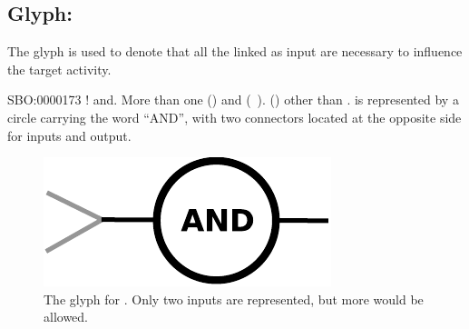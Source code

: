 \subsection{Glyph: }
\label{sec:af:and}

The glyph  is used to denote that all the  linked as input are necessary to influence the target activity.

\begin{glyphDescription}
 \glyphSboTerm SBO:0000173 ! and.
 \glyphOrigin More than one  () and  (~).
 \glyphTarget  {} () other than .
 \glyphNode {} is represented by a circle carrying the word ``AND'',  with two connectors located at the opposite side for inputs and output.
\end{glyphDescription}

\begin{figure}[H]
  \centering
  \includegraphics[scale = 0.5]{images/and}
  \caption{The \AF glyph for . Only two inputs are represented, but more would be allowed.}
  \label{fig:af:and}
\end{figure}
